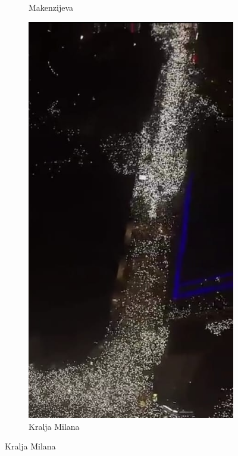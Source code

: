 \documentclass[a4paper,12pt]{article}
\begin{document}
\begin{figure}[H]
\begin{subfigure}[b]{0.3\textwidth}
	  \caption{Makenzijeva}
	  \label{fig:makenzijeva}
	\end{subfigure}
	\hfill
	\begin{subfigure}[b]{0.3\textwidth}
	  \centering
	  \includegraphics[width=\textwidth]{../images/kralja-milana.jpeg}
	  \caption{Kralja Milana}
	  \label{fig:kralja-milana}

\end{subfigure}
\end{figure}
\end{document}
